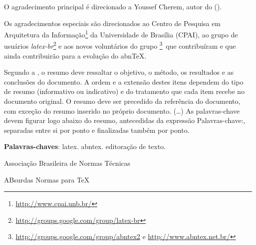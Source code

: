 \documentclass[
	12pt,				%
	openright,			%
	twoside,			%
	a4paper,			%
	english,			%
	french,				%
	spanish,			%
	brazil,				%
	]{abntex2}
\begin{document}
\begin{agradecimentos}
O agradecimento principal é direcionado a Youssef Cherem, autor do
 ().

Os agradecimentos especiais são direcionados ao Centro de Pesquisa em
Arquitetura da Informação\footnote{\url{http://www.cpai.unb.br/}} da Universidade de
Brasília (CPAI), ao grupo de usuários
\emph{latex-br}\footnote{\url{http://groups.google.com/group/latex-br}} e aos
novos voluntários do grupo
\emph{\abnTeX}\footnote{\url{http://groups.google.com/group/abntex2} e
\url{http://www.abntex.net.br/}}~que contribuíram e que ainda
contribuirão para a evolução do abn\TeX.

\end{agradecimentos}


\setlength{\absparsep}{18pt} %
\begin{resumo}
 Segundo a , o resumo deve ressaltar o
 objetivo, o método, os resultados e as conclusões do documento. A ordem e a extensão
 destes itens dependem do tipo de resumo (informativo ou indicativo) e do
 tratamento que cada item recebe no documento original. O resumo deve ser
 precedido da referência do documento, com exceção do resumo inserido no
 próprio documento. (\ldots) As palavras-chave devem figurar logo abaixo do
 resumo, antecedidas da expressão Palavras-chave:, separadas entre si por
 ponto e finalizadas também por ponto.

 \noindent
 \textbf{Palavras-chaves}: latex. abntex. editoração de texto.
\end{resumo}

\listoffigures*
\cleardoublepage

\listoftables*
\cleardoublepage

\begin{siglas}
  \item[ABNT] Associação Brasileira de Normas Técnicas
  \item[abnTeX] ABsurdas Normas para TeX
\end{siglas}
\end{document}
